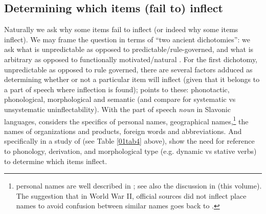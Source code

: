 \documentclass[output=paper,colorlinks,citecolor=brown]{langscibook}
\begin{document}
\subsection{Determining which items (fail to) inflect} \label{01sec3.2}

Naturally we ask why some items fail to inflect (or indeed why some items inflect). We may frame the question in terms of ``two ancient dichotomies'': we ask what is unpredictable as opposed to predictable/rule-governed, and what is arbitrary as opposed to functionally motivated/natural \citep[107]{bye2015}. For the first dichotomy, unpredictable as opposed to rule governed, there are several factors adduced as determining whether or not a particular item will inflect (given that it belongs to a part of speech where inflection is found); \citet{fedden2019} points to these: phonotactic, phonological, morphological and semantic (and compare \citealt[17--19]{doleschal2000} for systematic vs unsystematic uninflectability). With the part of speech \textit{noun} in Slavonic languages, \citet[48--151]{doleschal2000} considers the specifics of personal names, geographical names,\footnote{ personal names are well described in \citet[153--158]{timberlake2004}; see also the discussion in \citeauthor{spencer2025} (this volume). The suggestion that in World War II,  official sources did not inflect place names to avoid confusion between similar names goes back to \citet[105]{mirtov1953}.} the names of organizations and products, foreign words and abbreviations. And specifically in a study of  (see Table \ref{01tab4} above), \citet{chumakinacorbett2015} show the need for reference to phonology, derivation, and morphological type (e.g. dynamic vs stative verbs) to determine which items inflect.
\end{document}
